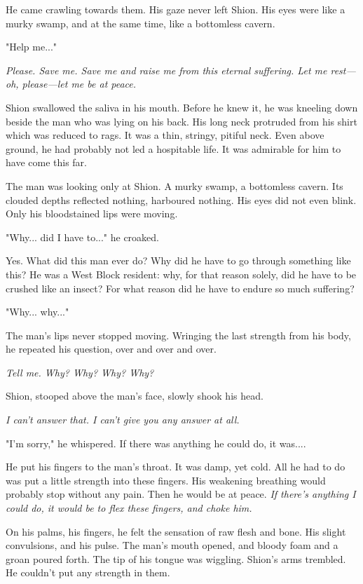 He came crawling towards them. His gaze never left Shion. His eyes were
like a murky swamp, and at the same time, like a bottomless cavern.

"Help me..."

\emph{Please. Save me. Save me and raise me from this eternal suffering. Let
me rest---oh, please---let me be at peace.}

Shion swallowed the saliva in his mouth. Before he knew it, he was
kneeling down beside the man who was lying on his back. His long neck
protruded from his shirt which was reduced to rags. It was a thin,
stringy, pitiful neck. Even above ground, he had probably not led a
hospitable life. It was admirable for him to have come this far.

The man was looking only at Shion. A murky swamp, a bottomless cavern.
Its clouded depths reflected nothing, harboured nothing. His eyes did
not even blink. Only his bloodstained lips were moving.

"Why... did I have to..." he croaked.

Yes. What did this man ever do? Why did he have to go through something
like this? He was a West Block resident: why, for that reason solely,
did he have to be crushed like an insect? For what reason did he have to
endure so much suffering?

"Why... why..."

The man's lips never stopped moving. Wringing the last strength from his
body, he repeated his question, over and over and over.

\emph{Tell me. Why? Why? Why? Why?}

Shion, stooped above the man's face, slowly shook his head.

\emph{I can't answer that. I can't give you any answer at all.}

"I'm sorry," he whispered. If there was anything he could do, it was....

He put his fingers to the man's throat. It was damp, yet cold. All he
had to do was put a little strength into these fingers. His weakening
breathing would probably stop without any pain. Then he would be at
peace. \emph{If there's anything I could do, it would be to flex these
fingers, and choke him.}

On his palms, his fingers, he felt the sensation of raw flesh and bone.
His slight convulsions, and his pulse. The man's mouth opened, and
bloody foam and a groan poured forth. The tip of his tongue was
wiggling. Shion's arms trembled. He couldn't put any strength in them.

